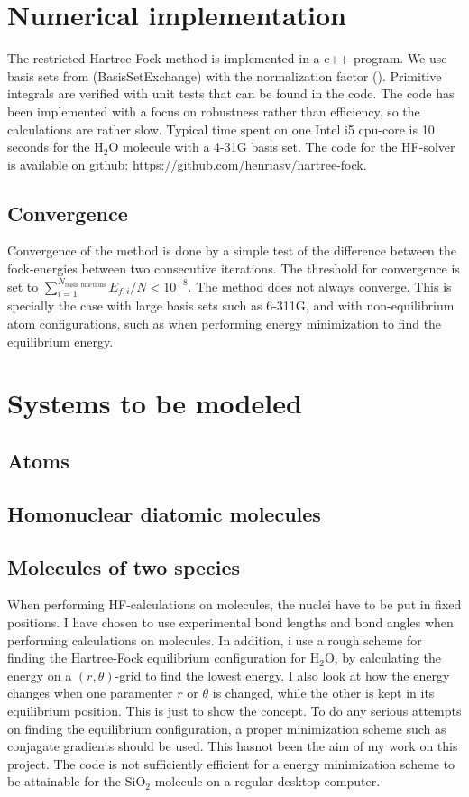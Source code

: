 \documentclass[a4paper,10pt, twocolumn, pre]{revtex4}
\begin{document}
\section{Numerical implementation}
The restricted Hartree-Fock method is implemented in a c++ program. We use basis sets from (BasisSetExchange) with the normalization factor (). 
Primitive integrals are verified with unit tests that can be found in the code.
The code has been implemented with a focus on robustness rather than efficiency, so the calculations are rather slow. Typical time spent on one Intel i5 cpu-core is 10 seconds for the H$_2$O molecule with a 4-31G basis set. The code for the HF-solver is available on github: \url{https://github.com/henriasv/hartree-fock}.

\subsection{Convergence}
Convergence of the method is done by a simple test of the difference between the fock-energies between two consecutive iterations. The threshold for convergence is set to $\sum_{i=1}^{N_{\text{basis functions}}} E_{f, i}/N < 10^{-8}$. The method does not always converge. This is specially the case with large basis sets such as 6-311G, and with non-equilibrium atom configurations, such as when performing energy minimization to find the equilibrium energy.

\section{Systems to be modeled}

\subsection{Atoms}

\subsection{Homonuclear diatomic molecules}

\subsection{Molecules of two species}
When performing HF-calculations on molecules, the nuclei have to be put in fixed positions. I have chosen to use experimental bond lengths and bond angles when performing calculations on molecules. In addition, i use a rough scheme for finding the Hartree-Fock equilibrium configuration for H$_2$O, by calculating the energy on a $(r, \theta)$-grid to find the lowest energy. I also look at how the energy changes when one paramenter $r$ or $\theta$ is changed, while the other is kept in its equilibrium position. This is just to show the concept. To do any serious attempts on finding the equilibrium configuration, a proper minimization scheme such as conjagate gradients should be used. This hasnot been the aim of my work on this project. The code is not sufficiently efficient for a energy minimization scheme to be attainable for the SiO$_2$ molecule on a regular desktop computer. 
\end{document}
